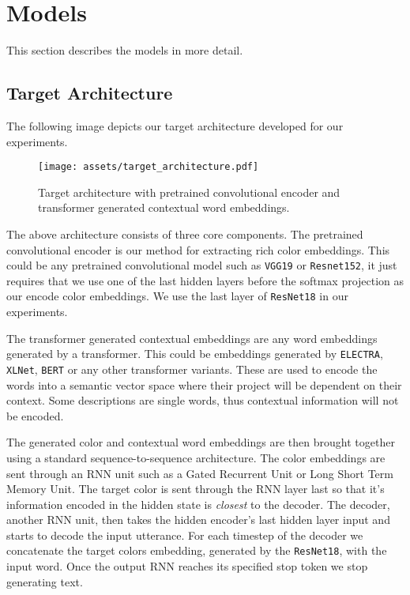 \section{Models}

This section describes the models in more detail.

\subsection{Target Architecture}
The following image depicts our target architecture developed for our experiments.

\begin{figure}[ht]
\centering
\texttt{[image: assets/target\_architecture.pdf]}
\caption[Target Architecture]
{Target architecture with pretrained convolutional encoder and transformer generated contextual word embeddings.}
\label{overview}
\end{figure}

\par
The above architecture consists of three core components. The pretrained convolutional encoder is our method for extracting rich color embeddings. This could be any pretrained convolutional model such as \texttt{VGG19} or \texttt{Resnet152}, it just requires that we use one of the last hidden layers before the softmax projection as our encode color embeddings. We use the last layer of \texttt{ResNet18} in our experiments.

\par
The transformer generated contextual embeddings are any word embeddings generated by a transformer. This could be embeddings generated by \texttt{ELECTRA}, \texttt{XLNet}, \texttt{BERT} or any other transformer variants. These are used to encode the words into a semantic vector space where their project will be dependent on their context. Some descriptions are single words, thus contextual information will not be encoded.

\par
The generated color and contextual word embeddings are then brought together using a standard sequence-to-sequence architecture. The color embeddings are sent through an RNN unit such as a Gated Recurrent Unit or Long Short Term Memory Unit. The target color is sent through the RNN layer last so that it’s information encoded in the hidden state is \emph{closest} to the decoder. The decoder, another RNN unit,  then takes the hidden encoder's last hidden layer input and starts to decode the input utterance. For each timestep of the decoder we concatenate the target colors embedding, generated by the \texttt{ResNet18}, with the input word. Once the output RNN reaches its specified stop token we stop generating text.